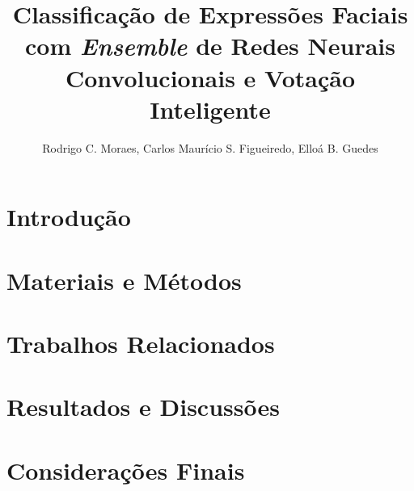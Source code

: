 \documentclass[12pt]{article}
\title{Classificação de Expressões Faciais com \emph{Ensemble} de Redes Neurais Convolucionais e Votação Inteligente}
\author{Rodrigo C. Moraes, Carlos Maurício S. Figueiredo, Elloá B. Guedes \email{\{rcm, cfigueiredo, ebgcosta\}.eng@uea.edu.br}
}
\begin{document}
\maketitle




\section{Introdução}


\section{Materiais e Métodos}


\section{Trabalhos Relacionados}


\section{Resultados e Discussões}


\section{Considerações Finais}





\end{document}
